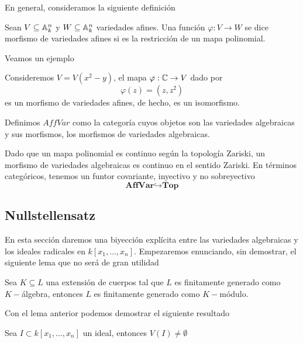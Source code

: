 \documentclass[11pt]{article}
\begin{document}
\noindent En general, consideramos la siguiente definición

\begin{dfn}
    Sean $V\subseteq\mathbb{A}_{k}^{n}$ y $W\subseteq\mathbb{A}_{k}^{n}$ variedades afines. Una función 
    $\varphi:V\to W$ se dice morfismo de variedades afines si es la restricción de un mapa 
    polinomial.
\end{dfn}

\noindent Veamos un ejemplo

\begin{ejm}
    Consideremos $V=V(x^{2}-y)$, el mapa $\varphi:\mathbb{C}\to V$ dado por
    \begin{equation*}
        \varphi(z)=(z,z^{2})
    \end{equation*}
    es un morfismo de variedades afines, de hecho, es un isomorfismo.
\end{ejm}

\noindent Definimos $AffVar$ como la categoría cuyos objetos son las variedades algebraicas y sus
morfismos, los morfismos de variedades algebraicas.

\vspace{1mm}
\obs Dado que un mapa polinomial es continuo según la topología Zariski, un morfismo de variedades 
algebraicas es continuo en el sentido Zariski. En términos categóricos, tenemos un funtor 
covariante, inyectivo y no sobreyectivo
\begin{equation*}
    \textbf{AffVar}\hookrightarrow \textbf{Top}
\end{equation*}

\newpage

\subsection{Nullstellensatz}

En esta sección daremos una biyección explícita entre las variedades algebraicas y los ideales
radicales en $k[x_{1},\dots,x_{n}]$. Empezaremos enunciando, sin demostrar, el siguiente lema que
no será de gran utilidad

\begin{lema}
    Sea $K\subseteq L$ una extensión de cuerpos tal que $L$ es finitamente generado como 
    $K-$álgebra, entonces $L$ es finitamente generado como $K-$módulo.
\end{lema}

\noindent Con el lema anterior podemos demostrar el siguiente resultado

\begin{lema}
    Sea $I\subset k[x_{1},\dots,x_{n}]$ un ideal, entonces $V(I)\neq\emptyset$
\end{lema}
\end{document}
